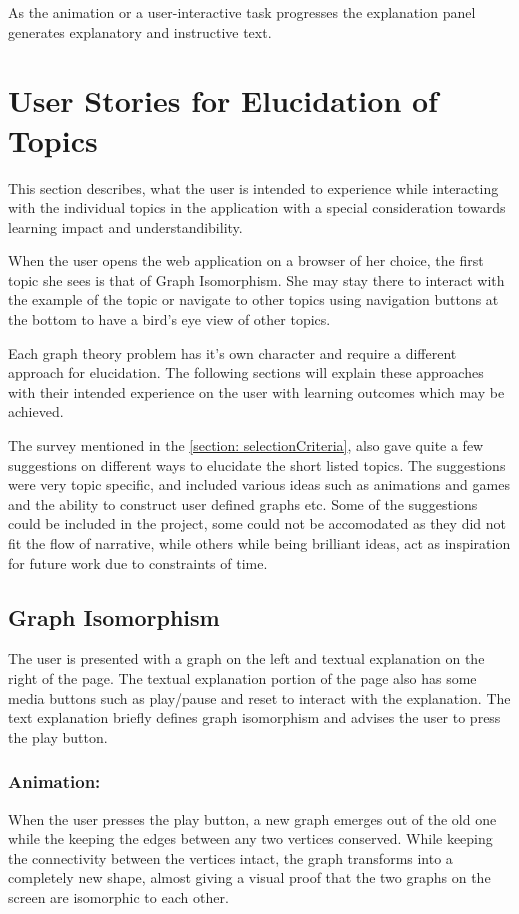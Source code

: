 As the animation or a user-interactive task progresses the explanation panel
generates explanatory and instructive text.

\section{User Stories for Elucidation of Topics}

This section describes, what the user is intended to experience while
interacting with the individual topics in the application with a special
consideration towards learning impact and understandibility.

When the user opens the web application on a browser of her choice, the first
topic she sees is that of Graph Isomorphism. She may stay there to interact
with the example of the topic or navigate to other topics using navigation
buttons at the bottom to have a bird's eye view of other topics.

Each graph theory problem has it's own character and require a different
approach for elucidation. The following sections will explain these approaches
with their intended experience on the user with learning outcomes which may be
achieved.

The survey mentioned in the \autoref{section: selectionCriteria}, also gave
quite a few suggestions on different ways to elucidate the short listed topics.
The suggestions were very topic specific, and included various ideas such as
animations and games and the ability to construct user defined graphs etc. Some
of the suggestions could be included in the project, some could not be
accomodated as they did not fit the flow of narrative, while others while being
brilliant ideas, act as inspiration for future work due to constraints of time.

\subsection{Graph Isomorphism}
The user is presented with a graph on the left and textual explanation on the
right of the page.  The textual explanation portion of the page also has some
media buttons such as play/pause and reset to interact with the explanation.
The text explanation briefly defines graph isomorphism and advises the user to
press the play button.

\subsubsection{Animation:}
When the user presses the play button, a new graph emerges out of the old one
while the keeping the edges between any two vertices conserved. While keeping
the connectivity between the vertices intact, the graph transforms into a
completely new shape, almost giving a visual proof that the two graphs on the
screen are isomorphic to each other.

